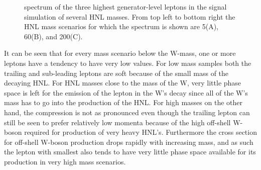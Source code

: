 \begin{figure}[h]
\noindent
{}
\caption{\pt spectrum of the three highest generator-level leptons in
  the signal simulation of several HNL masses. From top left to bottom
  right the HNL mass scenarios for which the spectrum is shown are
  5\GeV (A), 60\GeV (B), and 200\GeV (C). \willem}
\label{fig:genPt}
\end{figure}

It can be seen that for every mass scenario below the W-mass, one or
more leptons have a tendency to have very low \pt values. For low mass
samples both the trailing and sub-leading leptons are soft because of
the small mass of the decaying HNL. For HNL masses close to the mass of
the W, very little phase space is left for the emission of the lepton
in the W's decay since all of the W's mass has to go into the
production of the HNL. For high masses on the other hand, the
compression is not as pronounced even though the trailing lepton can
still be seen to prefer relatively low momenta because of the high off-shell W-boson required for production of very heavy
HNL's. Furthermore the cross section for off-shell W-boson production drops
rapidly with increasing mass, and as such the lepton with smallest \pt
also tends to have very little phase space available for its production in
very high mass scenarios.

